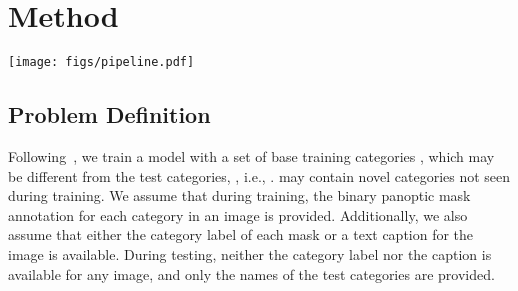 \documentclass[10pt,twocolumn,letterpaper]{article}
\newcommand{\ourmethod}{ODISE}
\begin{document}
\section{Method}

\begin{figure*}[t]
    \centering
    \texttt{[image: figs/pipeline.pdf]}
    \vspace{-1.5em}
    \caption{
        \textbf{\ourmethod{} Overview and Training Pipeline}. 
        We first encode the input image into an implicit text embedding with an implicit captioner (image encoder  and MLP). 
        With the image and its implicit text embedding as input, we extract their diffusion features from a frozen text-to-image diffusion UNet (Sec~\ref{sec:diffusion}). 
        With the UNet's features, a mask generator predicts class-agnostic binary masks and their associated mask embedding features (Sec~\ref{sec:mask-generator}).
        We perform a dot product between the mask embedding features and the text embeddings of training category names (\textcolor[HTML]{EC603D}{red box}) or the nouns of the image's caption (\textcolor[HTML]{008F00}{green box}) to categorize them.
        The similarity matrix for mask classification is supervised by either a cross entropy loss with ground truth category labels (\textcolor[HTML]{EC603D}{red solid path}), or via a grounding loss with the paired image captions (\textcolor[HTML]{008F00}{green dash path}) (Sec~\ref{sec:discriminative}).
    }
    \vspace{-1.5em}
    \label{fig:pipeline}
\end{figure*}
\vspace{-0.25em}
\subsection{Problem Definition}
\vspace{-0.25em}
\label{sec:preliminaries}
Following~\cite{kirillov2019panoptic, ding2022open}, we train a model with a set of base training categories , which may be different from the test categories, , i.e., .  may contain novel categories not seen during training. We assume that during training, the binary panoptic mask annotation for each category in an image is provided. Additionally, we also assume that either the category label of each mask or a text caption for the image is available. During testing, neither the category label nor the caption is available for any image, and only the names of the test categories  are provided.
\end{document}
